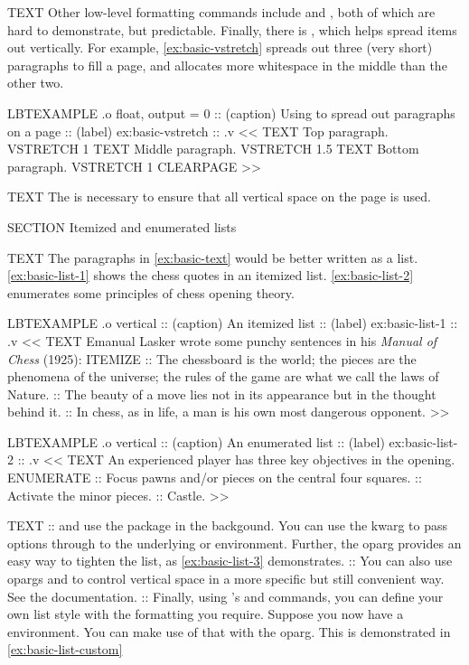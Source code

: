 \begin{lbt}
    TEXT Other low-level formatting commands include  and , both of which are hard to demonstrate, but predictable. Finally, there is , which helps spread items out vertically. For example, \cref{ex:basic-vstretch} spreads out three (very short) paragraphs to fill a page, and allocates more whitespace in the middle than the other two.

    LBTEXAMPLE .o float, output = 0
    :: (caption) Using  to spread out paragraphs on a page
    :: (label) ex:basic-vstretch
    :: .v <<
      TEXT Top paragraph.
      VSTRETCH 1
      TEXT Middle paragraph.
      VSTRETCH 1.5
      TEXT Bottom paragraph.
      VSTRETCH 1
      CLEARPAGE
    >>

    TEXT The  is necessary to ensure that all vertical space on the page is used.

    SECTION Itemized and enumerated lists

    TEXT The paragraphs in \cref{ex:basic-text} would be better written as a list. \cref{ex:basic-list-1} shows the chess quotes in an itemized list. \cref{ex:basic-list-2} enumerates some principles of chess opening theory.

    LBTEXAMPLE .o vertical
    :: (caption) An itemized list
    :: (label) ex:basic-list-1
    :: .v <<
      TEXT Emanual Lasker wrote some punchy sentences in his \emph{Manual of Chess} (1925):
      ITEMIZE
      :: The chessboard is the world; the pieces are the phenomena of the universe; the rules of the game are what we call the laws of Nature.
      :: The beauty of a move lies not in its appearance but in the thought behind it.
      :: In chess, as in life, a man is his own most dangerous opponent.
    >>

    LBTEXAMPLE .o vertical
    :: (caption) An enumerated list
    :: (label) ex:basic-list-2
    :: .v <<
      TEXT An experienced player has three key objectives in the opening.
      ENUMERATE
      :: Focus pawns and/or pieces on the central four squares.
      :: Activate the minor pieces.
      :: Castle.
    >>

    TEXT
    ::  and  use the  package in the backgound. You can use the kwarg  to pass options through to the underlying  or  environment. Further, the oparg  provides an easy way to tighten the list, as \cref{ex:basic-list-3} demonstrates.
    :: You can also use opargs  and  to control vertical space in a more specific but still convenient way. See the documentation.
    :: Finally, using 's  and  commands, you can define your own list style with the formatting you require. Suppose you now have a  environment. You can make use of that with the  oparg. This is demonstrated in \cref{ex:basic-list-custom}


\end{lbt}
